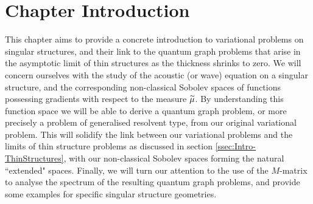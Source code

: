 \section{Chapter Introduction} \label{sec:ScalarEqnChapterIntro}
This chapter aims to provide a concrete introduction to variational problems on singular structures, and their link to the quantum graph problems that arise in the asymptotic limit of thin structures as the thickness shrinks to zero.
We will concern ourselves with the study of the acoustic (or wave) equation on a singular structure, and the corresponding non-classical Sobolev spaces of functions possessing gradients with respect to the measure $\widetilde{\mu}$.
By understanding this function space we will be able to derive a quantum graph problem, or more precisely a problem of generalised resolvent type, from our original variational problem.
This will solidify the link between our variational problems and the limits of thin structure problems as discussed in section \ref{ssec:Intro-ThinStructures}, with our non-classical Sobolev spaces forming the natural ``extended" spaces.
Finally, we will turn our attention to the use of the $M$-matrix to analyse the spectrum of the resulting quantum graph problems, and provide some examples for specific singular structure geometries.

